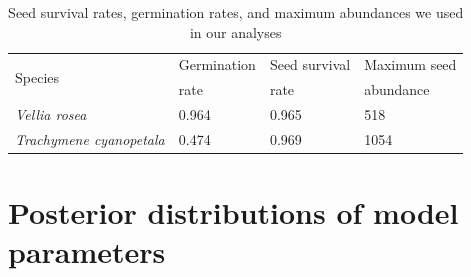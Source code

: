 \begin{refsection}
\begin{table}[ht]
\caption[Seed survival rates, germination rates, and maximum abundances we used in our analyses]{
Seed survival rates, germination rates, and maximum abundances we used in our analyses
}
\centering
\begin{tabular}{llll}
  \hline
 \multirow{2}{*}{Species} & Germination & Seed survival & Maximum seed \\
 & rate & rate & abundance \\
  \hline
 \textit{Vellia rosea} & 0.964 & 0.965 & 518 \\
 \textit{Trachymene cyanopetala} & 0.474 & 0.969 & 1054 \\
   \hline
\end{tabular}
\end{table}



\section*{Posterior distributions of model parameters}





\end{refsection}
